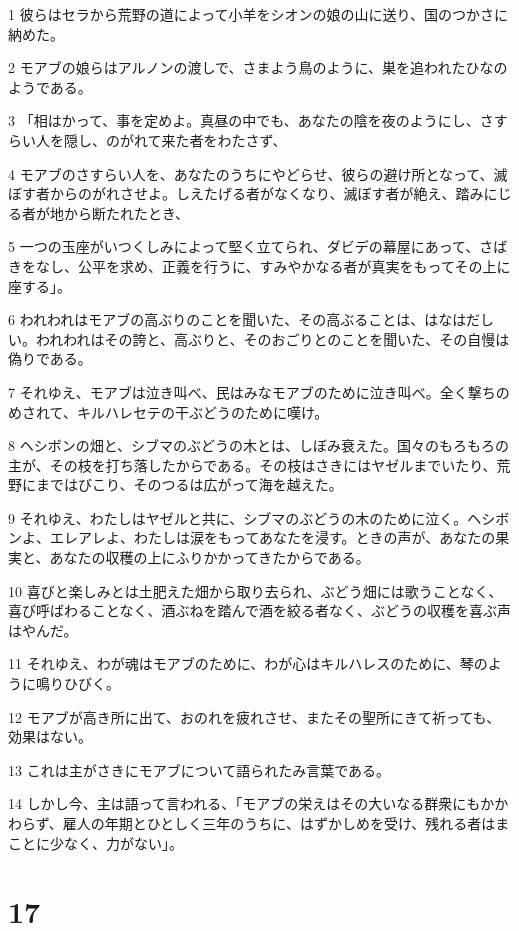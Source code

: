 \par 1 彼らはセラから荒野の道によって小羊をシオンの娘の山に送り、国のつかさに納めた。
\par 2 モアブの娘らはアルノンの渡しで、さまよう鳥のように、巣を追われたひなのようである。
\par 3 「相はかって、事を定めよ。真昼の中でも、あなたの陰を夜のようにし、さすらい人を隠し、のがれて来た者をわたさず、
\par 4 モアブのさすらい人を、あなたのうちにやどらせ、彼らの避け所となって、滅ぼす者からのがれさせよ。しえたげる者がなくなり、滅ぼす者が絶え、踏みにじる者が地から断たれたとき、
\par 5 一つの玉座がいつくしみによって堅く立てられ、ダビデの幕屋にあって、さばきをなし、公平を求め、正義を行うに、すみやかなる者が真実をもってその上に座する」。
\par 6 われわれはモアブの高ぶりのことを聞いた、その高ぶることは、はなはだしい。われわれはその誇と、高ぶりと、そのおごりとのことを聞いた、その自慢は偽りである。
\par 7 それゆえ、モアブは泣き叫べ、民はみなモアブのために泣き叫べ。全く撃ちのめされて、キルハレセテの干ぶどうのために嘆け。
\par 8 ヘシボンの畑と、シブマのぶどうの木とは、しぼみ衰えた。国々のもろもろの主が、その枝を打ち落したからである。その枝はさきにはヤゼルまでいたり、荒野にまではびこり、そのつるは広がって海を越えた。
\par 9 それゆえ、わたしはヤゼルと共に、シブマのぶどうの木のために泣く。ヘシボンよ、エレアレよ、わたしは涙をもってあなたを浸す。ときの声が、あなたの果実と、あなたの収穫の上にふりかかってきたからである。
\par 10 喜びと楽しみとは土肥えた畑から取り去られ、ぶどう畑には歌うことなく、喜び呼ばわることなく、酒ぶねを踏んで酒を絞る者なく、ぶどうの収穫を喜ぶ声はやんだ。
\par 11 それゆえ、わが魂はモアブのために、わが心はキルハレスのために、琴のように鳴りひびく。
\par 12 モアブが高き所に出て、おのれを疲れさせ、またその聖所にきて祈っても、効果はない。
\par 13 これは主がさきにモアブについて語られたみ言葉である。
\par 14 しかし今、主は語って言われる、「モアブの栄えはその大いなる群衆にもかかわらず、雇人の年期とひとしく三年のうちに、はずかしめを受け、残れる者はまことに少なく、力がない」。

\chapter{17}

